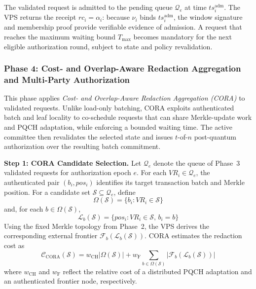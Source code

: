 \documentclass[lettersize,journal]{IEEEtran}
\begin{document}
The validated request is admitted to the pending queue
$\mathcal{Q}_e$ at time $ts_i^{\mathrm{adm}}$. The VPS returns
the receipt $rc_i=\alpha_i$: because $\nu_i$ binds
$ts_i^{\mathrm{adm}}$, the window signature and membership proof
provide verifiable evidence of admission. A request that reaches
the maximum waiting bound $T_{\max}$ becomes mandatory for the next
eligible authorization round, subject to state and policy revalidation.    
    
  \subsubsection*{\textbf{Phase 4: Cost- and Overlap-Aware Redaction
Aggregation and Multi-Party Authorization}}

This phase applies \emph{Cost- and Overlap-Aware Redaction Aggregation
(CORA)} to validated requests. Unlike load-only batching, CORA exploits
authenticated batch and leaf locality to co-schedule requests that can
share Merkle-update work and PQCH adaptation, while enforcing a bounded
waiting time. The active committee then revalidates the selected state
and issues $t$-of-$n$ post-quantum authorization over the resulting
batch commitment.

\medskip
\noindent\textbf{Step 1: CORA Candidate Selection.}
Let $\mathcal{Q}_e$ denote the queue of Phase~3 validated requests for
authorization epoch $e$. For each $VR_i\in\mathcal{Q}_e$, the authenticated
pair $(b_i,pos_i)$ identifies its target transaction batch and Merkle
position. For a candidate set $\mathcal{S}\subseteq\mathcal{Q}_e$, define
\begin{equation}
\Omega(\mathcal{S})
=
\{b_i:VR_i\in\mathcal{S}\}
\end{equation}
and, for each $b\in\Omega(\mathcal{S})$,
\begin{equation}
\mathcal{L}_b(\mathcal{S})
=
\{pos_i:VR_i\in\mathcal{S},\,b_i=b\}
\end{equation}
Using the fixed Merkle topology from Phase~2, the VPS derives the
corresponding external frontier
$\mathcal{F}_b(\mathcal{L}_b(\mathcal{S}))$. CORA estimates the
redaction cost as
\begin{equation}
\mathcal{C}_{\mathrm{CORA}}(\mathcal{S})
=
w_{\mathrm{CH}}|\Omega(\mathcal{S})|
+
w_{\mathrm{F}}
\sum_{b\in\Omega(\mathcal{S})}
|\mathcal{F}_b(\mathcal{L}_b(\mathcal{S}))|
\end{equation}
where $w_{\mathrm{CH}}$ and $w_{\mathrm{F}}$ reflect the relative cost
of a distributed PQCH adaptation and an authenticated frontier node,
respectively.
\end{document}
